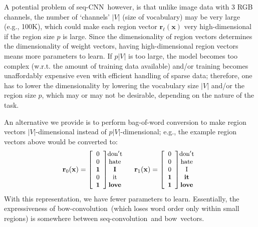 \documentclass[11pt,letterpaper]{article}
\newcommand{\scnn}{seq-CNN}
\newcommand{\sconv}{seq-convolution}
\newcommand{\bconv}{bow-convolution}
\newcommand{\bowf}{f_{\rm bow}}
\newcommand{\bow}{{bow}}
\newcommand{\bx}{{\mathbf x}}
\newcommand{\bw}{{\mathbf w}}
\newcommand{\psz}{p}
\newcommand{\voc}{V}
\newcommand{\vsz}{|\voc|}
\newcommand{\wei}{\bw}
\newcommand{\region}{{\mathbf r}} %
\newcommand{\iL}{\ell} %
\newcommand{\iB}{i}     %
\newcommand{\bEqsz}{\begin{small}}
\newcommand{\eEqsz}{\end{small}}
\begin{document}
A potential problem of \scnn\, 
however, is that unlike image data with 3 RGB channels, 
the number of `channels' $\vsz$ (size of vocabulary) may be very 
large (e.g., 100K), which could make each region vector $\region_\iL(\bx)$ very high-dimensional 
if the region size $\psz$ is large.  
Since the dimensionality of region vectors determines the dimensionality of weight vectors, 
having high-dimensional region vectors means more parameters to learn.  If $\psz\vsz$ is too large, 
the model becomes too complex (w.r.t. the amount of training data available) and/or training 
becomes unaffordably expensive even with efficient handling of sparse data; 
therefore, one has to lower the dimensionality by lowering 
the vocabulary size $\vsz$ and/or the region size $\psz$, which may or may not be desirable, 
depending on the nature of the task.  

An alternative we provide is to perform bag-of-word conversion to make region vectors 
$\vsz$-dimensional instead of $\psz\vsz$-dimensional; 
e.g., the example region vectors above would be converted to: 
\vspace{-0.25in}
\[
\bEqsz
\region_0(\bx)=  %
\left[ 
  \begin{array}{c} 0 \cr 0 \cr{\bf 1}\cr 0 \cr{\bf 1} \end{array} 
\right]
\hspace{-0.1in}
  \begin{array}{c} {\rm don't}\cr{\rm hate}\cr{\rm \bf I}\cr{\rm it}\cr{\rm \bf love}\cr \end{array} 
~~~~                   
\region_1(\bx)=  %
\left[ 
  \begin{array}{c}  0 \cr 0 \cr 0 \cr{\bf 1}\cr{\bf 1} \cr \end{array} 
\right]
\hspace{-0.1in}
  \begin{array}{c} {\rm don't}\cr{\rm hate}\cr{\rm I}\cr{\rm \bf it}\cr{\rm \bf love}\cr \end{array}
\eEqsz
\]
With this representation, we have fewer parameters to learn.  
Essentially, the expressiveness of \bconv\ (which loses word order only within small regions) 
is somewhere between 
\sconv\ and \bow\ vectors. 
\end{document}
